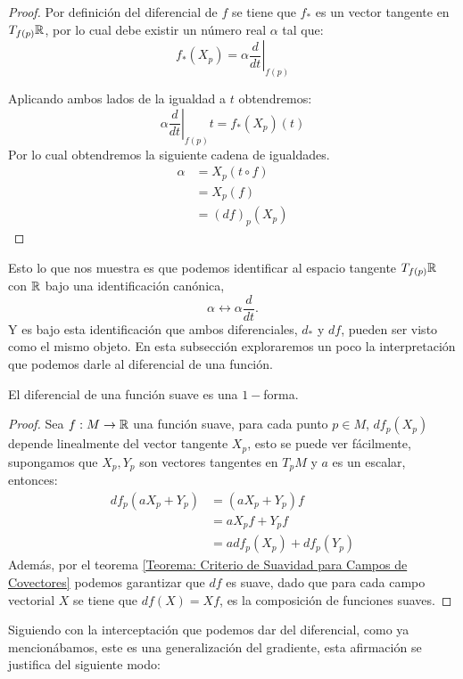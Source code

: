 \begin{proof}
	Por definición del diferencial de $f$ se tiene que $f_*$ es un vector tangente en $T_{f(p)}\mathbb{R}$, por lo cual debe existir un número real $\alpha$ tal que:
	\[
		f_*(X_p) = \alpha \left. \frac{d}{dt} \right|_{f(p)}
	\]

	Aplicando ambos lados de la igualdad a $t$ obtendremos:
	\[
		\alpha \left. \frac{d}{dt} \right|_{f(p)}t = f_*(X_p)(t)
	\]
	Por lo cual obtendremos la siguiente cadena de igualdades.
	\begin{align*}
		\alpha & = X_p(t \circ f) \\
		       & = X_p(f)         \\
		       & = (df)_p(X_p)
	\end{align*}
\end{proof}

Esto lo que nos muestra es que podemos identificar al espacio tangente $T_{f(p)}\mathbb{R}$ con $\mathbb{R}$ bajo una identificación canónica,
\[
	\alpha \longleftrightarrow \alpha \frac{d}{dt}.
\]
Y es bajo esta identificación que ambos diferenciales, $d_*$ y $df$, pueden ser visto como el mismo objeto. En esta subsección exploraremos un poco la interpretación que podemos darle al diferencial de una función.

\begin{lemma}
	El diferencial de una función suave es una $1-$forma.
\end{lemma}

\begin{proof}
	Sea $f: M \to \mathbb{R}$ una función suave, para cada punto $p \in M$, $df_p(X_p)$ depende linealmente del vector tangente $X_p$, esto se puede ver fácilmente, supongamos que $X_p, Y_p$ son vectores tangentes en $T_pM$ y $a$ es un escalar, entonces:
	\begin{align*}
		df_p( aX_p + Y_p) & = (a X_p + Y_p) f         \\
		                  & = a X_p f + Y_p f         \\
		                  & = a df_p(X_p) + df_p(Y_p)
	\end{align*}
	Además, por el teorema \ref{Teorema: Criterio de Suavidad para Campos de Covectores} podemos garantizar que $df$ es suave, dado que para cada campo vectorial $X$ se tiene que $df(X) = Xf$, es la composición de funciones suaves.
\end{proof}

Siguiendo con la interceptación que podemos dar del diferencial, como ya mencionábamos, este es una generalización del gradiente, esta afirmación se justifica del siguiente modo:

